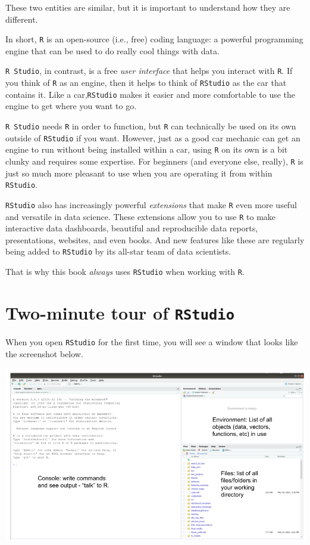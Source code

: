 \documentclass[
]{book}
\begin{document}
These two entities are similar, but it is important to understand how they are different.

In short, \texttt{R} is an open-source (i.e., free) coding language: a powerful programming engine that can be used to do really cool things with data.

\texttt{R\ Studio}, in contrast, is a free \emph{user interface} that helps you interact with \texttt{R}. If you think of \texttt{R} as an engine, then it helps to think of \texttt{RStudio} as the car that contains it. Like a car,\texttt{RStudio} makes it easier and more comfortable to use the engine to get where you want to go.

\texttt{R\ Studio} needs \texttt{R} in order to function, but \texttt{R} can technically be used on its own outside of \texttt{RStudio} if you want. However, just as a good car mechanic can get an engine to run without being installed within a car, using \texttt{R} on its own is a bit clunky and requires some expertise. For beginners (and everyone else, really), \texttt{R} is just so much more pleasant to use when you are operating it from within \texttt{RStudio}.

\texttt{RStudio} also has increasingly powerful \emph{extensions} that make \texttt{R} even more useful and versatile in data science. These extensions allow you to use \texttt{R} to make interactive data dashboards, beautiful and reproducible data reports, presentations, websites, and even books. And new features like these are regularly being added to \texttt{RStudio} by its all-star team of data scientists.

That is why this book \emph{always} uses \texttt{RStudio} when working with \texttt{R}.

\hypertarget{two-minute-tour-of-rstudio}{%
\section*{\texorpdfstring{Two-minute tour of \texttt{RStudio}}{Two-minute tour of RStudio}}\label{two-minute-tour-of-rstudio}}

When you open \texttt{RStudio} for the first time, you will see a window that looks like the screenshot below.

\includegraphics{img/rstudio_windows.png}
\end{document}
